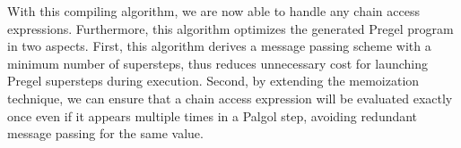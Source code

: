 \documentclass{sokendai_thesis} %
\begin{document}
With this compiling algorithm, we are now able to handle any chain access expressions.
Furthermore, this algorithm optimizes the generated Pregel program in two aspects.
First, this algorithm derives a message passing scheme with a minimum number of supersteps, thus reduces unnecessary cost for launching Pregel supersteps during execution.
Second, by extending the memoization technique, we can ensure that a chain access expression will be evaluated exactly once even if it appears multiple times in a Palgol step, avoiding redundant message passing for the same value.

\end{document}
